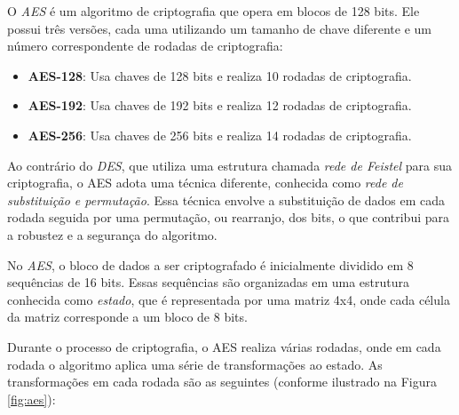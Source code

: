 O \textit{AES} é um algoritmo de criptografia que opera em blocos de 128 bits.
Ele possui três versões, cada uma utilizando um tamanho de chave diferente e um número correspondente de rodadas de criptografia:

\begin{itemize}
    \item \textbf{AES-128}: Usa chaves de 128 bits e realiza 10 rodadas de criptografia.
    \item \textbf{AES-192}: Usa chaves de 192 bits e realiza 12 rodadas de criptografia.
    \item \textbf{AES-256}: Usa chaves de 256 bits e realiza 14 rodadas de criptografia.
\end{itemize}

Ao contrário do \textit{DES}, que utiliza uma estrutura chamada \textit{rede de Feistel} para sua criptografia, o AES adota uma técnica diferente, conhecida como \textit{rede de substituição e permutação}.
Essa técnica envolve a substituição de dados em cada rodada seguida por uma permutação, ou rearranjo, dos bits, o que contribui para a robustez e a segurança do algoritmo.

No \textit{AES}, o bloco de dados a ser criptografado é inicialmente dividido em 8 sequências de 16 bits. Essas sequências são organizadas em uma estrutura conhecida como \textit{estado}, que é representada por uma matriz 4x4, onde cada célula da matriz corresponde a um bloco de 8 bits.

Durante o processo de criptografia, o AES realiza várias rodadas, onde em cada rodada o algoritmo aplica uma série de transformações ao estado.
As transformações em cada rodada são as seguintes (conforme ilustrado na Figura \ref{fig:aes}):


